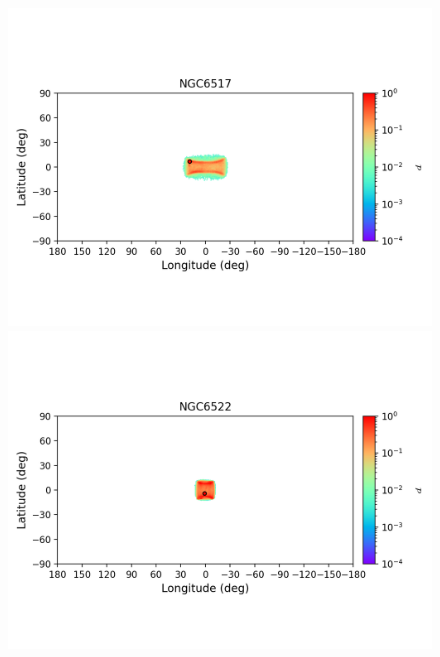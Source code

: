 \begin{figure}
\begin{center}
                \includegraphics[clip=true, trim = 0mm 20mm 0mm 10mm, width=1\columnwidth]{images/error_plots_NGC6517.png}
                \includegraphics[clip=true, trim = 0mm 20mm 0mm 10mm, width=1\columnwidth]{images/error_plots_NGC6522.png}
                

\end{center}
\end{figure}
